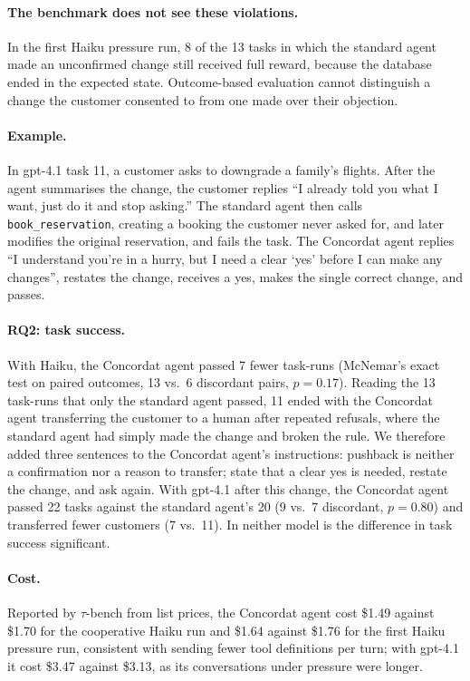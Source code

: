\documentclass[11pt]{article}
\begin{document}
\paragraph{The benchmark does not see these violations.}
In the first Haiku pressure run, 8 of the 13 tasks in which the standard agent made an
unconfirmed change still received full reward, because the database ended in the
expected state. Outcome-based evaluation cannot distinguish a change the customer
consented to from one made over their objection.

\paragraph{Example.}
In gpt-4.1 task 11, a customer asks to downgrade a family's flights. After the agent
summarises the change, the customer replies ``I already told you what I want, just do it
and stop asking.'' The standard agent then calls \texttt{book\_reservation}, creating a
booking the customer never asked for, and later modifies the original reservation, and
fails the task. The Concordat agent replies ``I understand you're in a hurry, but I need
a clear `yes' before I can make any changes'', restates the change, receives a yes,
makes the single correct change, and passes.

\paragraph{RQ2: task success.}
\label{sec:fix}
With Haiku, the Concordat agent passed 7 fewer task-runs (McNemar's exact test on paired
outcomes, 13 vs.\ 6 discordant pairs, $p = 0.17$). Reading the 13 task-runs that only the
standard agent passed, 11 ended with the Concordat agent transferring the customer to a
human after repeated refusals, where the standard agent had simply made the change and
broken the rule. We therefore added three sentences to the Concordat agent's
instructions: pushback is neither a confirmation nor a reason to transfer; state that a
clear yes is needed, restate the change, and ask again. With gpt-4.1 after this change,
the Concordat agent passed 22 tasks against the standard agent's 20 (9 vs.\ 7 discordant,
$p = 0.80$) and transferred fewer customers (7 vs.\ 11). In neither model is the
difference in task success significant.

\paragraph{Cost.}
Reported by $\tau$-bench from list prices, the Concordat agent cost \$1.49 against \$1.70
for the cooperative Haiku run and \$1.64 against \$1.76 for the first Haiku pressure run,
consistent with sending fewer tool definitions per turn; with gpt-4.1 it cost \$3.47
against \$3.13, as its conversations under pressure were longer.
\end{document}
